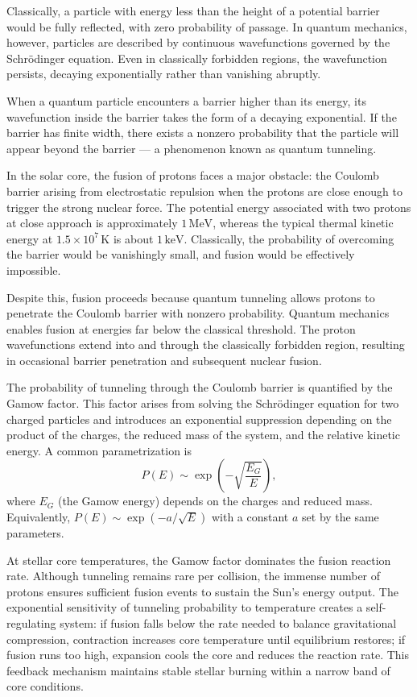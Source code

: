 Classically, a particle with energy less than the height of a potential barrier would be fully reflected, with zero probability of passage. In quantum mechanics, however, particles are described by continuous wavefunctions governed by the Schrödinger equation. Even in classically forbidden regions, the wavefunction persists, decaying exponentially rather than vanishing abruptly.

When a quantum particle encounters a barrier higher than its energy, its wavefunction inside the barrier takes the form of a decaying exponential. If the barrier has finite width, there exists a nonzero probability that the particle will appear beyond the barrier — a phenomenon known as quantum tunneling.

In the solar core, the fusion of protons faces a major obstacle: the Coulomb barrier arising from electrostatic repulsion when the protons are close enough to trigger the strong nuclear force. The potential energy associated with two protons at close approach is approximately $1\,\text{MeV}$, whereas the typical thermal kinetic energy at $1.5 \times 10^7\,\text{K}$ is about $1\,\text{keV}$. Classically, the probability of overcoming the barrier would be vanishingly small, and fusion would be effectively impossible.

Despite this, fusion proceeds because quantum tunneling allows protons to penetrate the Coulomb barrier with nonzero probability. Quantum mechanics enables fusion at energies far below the classical threshold. The proton wavefunctions extend into and through the classically forbidden region, resulting in occasional barrier penetration and subsequent nuclear fusion.

The probability of tunneling through the Coulomb barrier is quantified by the Gamow factor. This factor arises from solving the Schrödinger equation for two charged particles and introduces an exponential suppression depending on the product of the charges, the reduced mass of the system, and the relative kinetic energy. A common parametrization is
\[
P(E) \sim \exp\!\left( -\sqrt{\frac{E_G}{E}} \right),
\]
where $E_G$ (the Gamow energy) depends on the charges and reduced mass. Equivalently, $P(E) \sim \exp(-a/\sqrt{E})$ with a constant $a$ set by the same parameters.

At stellar core temperatures, the Gamow factor dominates the fusion reaction rate. Although tunneling remains rare per collision, the immense number of protons ensures sufficient fusion events to sustain the Sun's energy output. The exponential sensitivity of tunneling probability to temperature creates a self-regulating system: if fusion falls below the rate needed to balance gravitational compression, contraction increases core temperature until equilibrium restores; if fusion runs too high, expansion cools the core and reduces the reaction rate. This feedback mechanism maintains stable stellar burning within a narrow band of core conditions.

